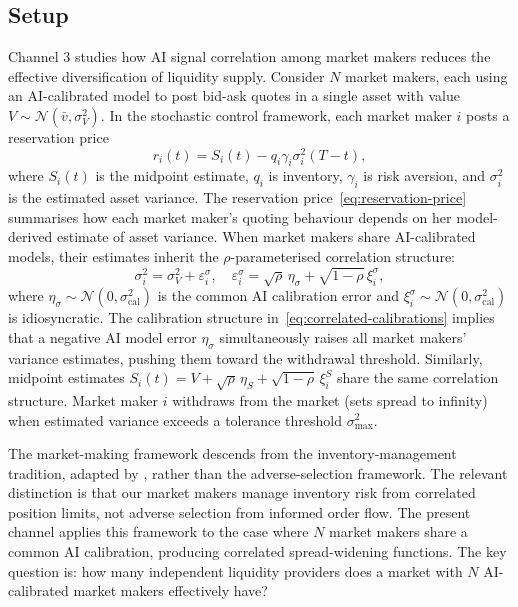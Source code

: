 \label{sec:channel3}

\subsection{Setup}

Channel 3 studies how AI signal correlation among market makers reduces the effective diversification of liquidity supply. Consider $N$ market makers, each using an AI-calibrated model to post bid-ask quotes in a single asset with value $V \sim \mathcal{N}(\bar{v}, \sigma_V^2)$. In the \citet{avellaneda2008} stochastic control framework, each market maker $i$ posts a reservation price
\begin{equation}\label{eq:reservation-price}
  r_i(t) = S_i(t) - q_i\gamma_i\sigma_i^2(T-t),
\end{equation}
where $S_i(t)$ is the midpoint estimate, $q_i$ is inventory, $\gamma_i$ is risk aversion, and $\sigma_i^2$ is the estimated asset variance. The reservation price~\eqref{eq:reservation-price} summarises how each market maker's quoting behaviour depends on her model-derived estimate of asset variance. When market makers share AI-calibrated models, their estimates inherit the $\rho$-parameterised correlation structure:
\begin{equation}\label{eq:correlated-calibrations}
  \sigma_i^2 = \sigma_V^2 + \varepsilon_i^\sigma, \quad \varepsilon_i^\sigma = \sqrt{\rho}\,\eta_\sigma + \sqrt{1-\rho}\,\xi_i^\sigma,
\end{equation}
where $\eta_\sigma \sim \mathcal{N}(0,\sigma_{\text{cal}}^2)$ is the common AI calibration error and $\xi_i^\sigma \sim \mathcal{N}(0,\sigma_{\text{cal}}^2)$ is idiosyncratic. The calibration structure in~\eqref{eq:correlated-calibrations} implies that a negative AI model error $\eta_\sigma$ simultaneously raises all market makers' variance estimates, pushing them toward the withdrawal threshold. Similarly, midpoint estimates $S_i(t) = V + \sqrt{\rho}\,\eta_S + \sqrt{1-\rho}\,\xi_i^S$ share the same correlation structure. Market maker $i$ withdraws from the market (sets spread to infinity) when estimated variance exceeds a tolerance threshold $\sigma_{\max}^2$.

The market-making framework descends from the \citet{kyle1985} inventory-management tradition, adapted by \citet{avellaneda2008}, rather than the \citet{glosten1985} adverse-selection framework. The relevant distinction is that our market makers manage inventory risk from correlated position limits, not adverse selection from informed order flow. The present channel applies this framework to the case where $N$ market makers share a common AI calibration, producing correlated spread-widening functions. The key question is: how many independent liquidity providers does a market with $N$ AI-calibrated market makers effectively have?

